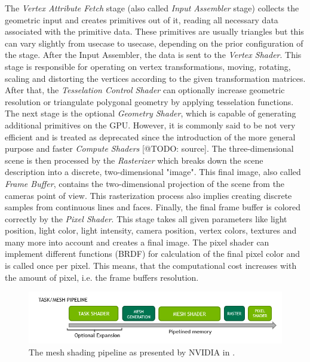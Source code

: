 \noindent
The \emph{Vertex Attribute Fetch} stage (also called \emph{Input Assembler} stage) collects the geometric 
input and creates primitives out of it, reading all necessary data associated with the primitive data. 
These primitives are usually triangles but this can vary slightly from usecase to usecase, depending
on the prior configuration of the stage. After the Input Assembler, the data is sent to the \emph{Vertex Shader}.
This stage is responsible for operating on vertex transformations, moving, rotating, scaling and distorting the 
vertices according to the given transformation matrices. After that, the \emph{Tesselation Control Shader} can 
optionally increase geometric resolution or triangulate polygonal geometry by applying tesselation functions.
The next stage is the optional \emph{Geometry Shader}, which is capable of generating additional primitives 
on the \ac{GPU}. However, it is commonly said to be not very efficient and is treated as deprecated since the introduction 
of the more general purpose and faster \emph{Compute Shaders} [@TODO: source]. 
The three-dimensional scene is then processed by the \emph{Rasterizer} which breaks down the scene description into 
a discrete, two-dimensional "image". This final image, also called \emph{Frame Buffer}, contains the two-dimensional 
projection of the scene from the cameras point of view. This rasterization process also implies creating discrete 
samples from continuous lines and faces.
Finally, the final frame buffer is colored correctly by the \emph{Pixel Shader}. This stage takes all given parameters 
like light position, light color, light intensity, camera position, vertex colors, textures and many more into account 
and creates a final image. The pixel shader can implement different functions (\ac{BRDF}) for calculation of the final 
pixel color and is called once per pixel. This means, that the computational cost increases with the amount of pixel, 
i.e. the frame buffers resolution. 


\begin{figure}[h]
    \centering
    \includegraphics[width=\linewidth]{images/graphics/mesh-rendering-pipeline.png}
    \caption{The mesh shading pipeline as presented by NVIDIA in \cite[Christoph Kubisch]{Kubisch2018}.}
    \label{fig:mesh-rendering-pipeline}
\end{figure}

